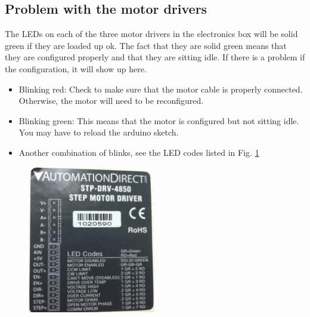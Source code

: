 \documentclass[11pt]{article}
\begin{document}
\subsection{Problem with the motor drivers}
The LEDs on each of the three motor drivers in the electronics box will be solid green if they are loaded up ok.
The fact that they are solid green means that they are configured properly and that they are sitting idle.  
If there is a problem if the configuration, it will show up here.
\begin{itemize}
 	\item Blinking red:  Check to make sure that the motor cable is properly connected.  Otherwise, the motor will need to be reconfigured.
	\item Blinking green:  This means that the motor is configured but not sitting idle.  You may have to reload the arduino sketch.  
	\item Another combination of blinks, see the LED codes listed in Fig. \ref{ledCodes}
\end{itemize}

\begin{figure}[h]
\begin{center}
\includegraphics[width = 2.2in]{photoLedCodes.JPG}
\caption{}  
\label{ledCodes}
\end{center}
\end{figure}
\end{document}
